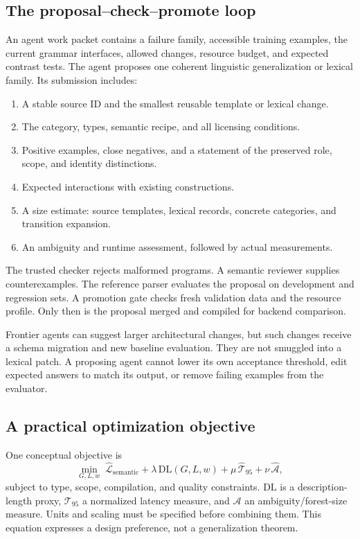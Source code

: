 \documentclass[11pt,a4paper]{article}
\begin{document}
\subsection{The proposal--check--promote loop}
An agent work packet contains a failure family, accessible training examples,
the current grammar interfaces, allowed changes, resource budget, and expected
contrast tests. The agent proposes one coherent linguistic generalization or
lexical family. Its submission includes:
\begin{enumerate}
  \item A stable source ID and the smallest reusable template or lexical change.
  \item The category, types, semantic recipe, and all licensing conditions.
  \item Positive examples, close negatives, and a statement of the preserved
  role, scope, and identity distinctions.
  \item Expected interactions with existing constructions.
  \item A size estimate: source templates, lexical records, concrete
  categories, and transition expansion.
  \item An ambiguity and runtime assessment, followed by actual measurements.
\end{enumerate}
The trusted checker rejects malformed programs. A semantic reviewer supplies
counterexamples. The reference parser evaluates the proposal on development
and regression sets. A promotion gate checks fresh validation data and the
resource profile. Only then is the proposal merged and compiled for backend
comparison.

Frontier agents can suggest larger architectural changes, but such changes
receive a schema migration and new baseline evaluation. They are not smuggled
into a lexical patch. A proposing agent cannot lower its own acceptance
threshold, edit expected answers to match its output, or remove failing
examples from the evaluator.

\subsection{A practical optimization objective}
One conceptual objective is
\begin{equation}
 \min_{G,L,w}\;
   \widehat{\mathcal L}_{\mathrm{semantic}}
   +\lambda\,\mathrm{DL}(G,L,w)
   +\mu\,\widehat{\mathcal T}_{95}
   +\nu\,\widehat{\mathcal A},
 \label{eq:objective}
\end{equation}
subject to type, scope, compilation, and quality constraints.
\(\mathrm{DL}\) is a description-length proxy, \(\mathcal T_{95}\) a
normalized latency measure, and \(\mathcal A\) an ambiguity/forest-size
measure. Units and scaling must be specified before combining them.
This equation expresses a design preference, not a generalization theorem.
\end{document}
